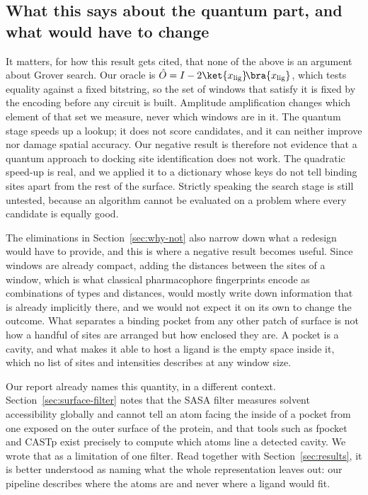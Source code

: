 \subsection{What this says about the quantum part, and what would have to change}
\label{sec:why-forward}

It matters, for how this result gets cited, that none of the above is an argument about
Grover search. Our oracle is
$\hat{O} = I - 2\ket{x_{\text{lig}}}\!\bra{x_{\text{lig}}}$, which tests equality against
a fixed bitstring, so the set of windows that satisfy it is fixed by the encoding before
any circuit is built. Amplitude amplification changes which element of that set we
measure, never which windows are in it. The quantum stage speeds up a lookup; it does not
score candidates, and it can neither improve nor damage spatial accuracy. Our negative
result is therefore not evidence that a quantum approach to docking site identification
does not work. The quadratic speed-up is real, and we applied it to a dictionary whose
keys do not tell binding sites apart from the rest of the surface. Strictly speaking the
search stage is still untested, because an algorithm cannot be evaluated on a problem
where every candidate is equally good.

The eliminations in Section~\ref{sec:why-not} also narrow down what a redesign would have
to provide, and this is where a negative result becomes useful. Since windows are already
compact, adding the distances between the sites of a window, which is what classical
pharmacophore fingerprints encode as combinations of types and distances, would mostly
write down information that is already implicitly there, and we would not expect it on
its own to change the outcome. What separates a binding pocket from any other patch of
surface is not how a handful of sites are arranged but how enclosed they are. A pocket is
a cavity, and what makes it able to host a ligand is the empty space inside it, which no
list of sites and intensities describes at any window size.

Our report already names this quantity, in a different context. Section~\ref{sec:surface-filter}
notes that the SASA filter measures solvent accessibility globally and cannot tell an
atom facing the inside of a pocket from one exposed on the outer surface of the protein,
and that tools such as fpocket and CASTp exist precisely to compute which atoms line a
detected cavity. We wrote that as a limitation of one filter. Read together with
Section~\ref{sec:results}, it is better understood as naming what the whole
representation leaves out: our pipeline describes where the atoms are and never where a
ligand would fit.


